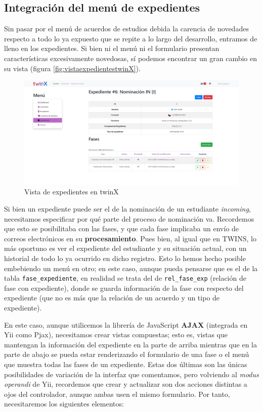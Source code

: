 \subsection{Integración del menú de expedientes}

Sin pasar por el menú de acuerdos de estudios debida la carencia de novedades respecto a todo lo ya expuesto que se repite a lo largo del desarrollo, entramos de lleno en los expedientes. Si bien ni el menú ni el formulario presentan características excesivamente novedosas, sí podemos encontrar un gran cambio en su vista (figura \ref{fig:vistaexpedientestwinX}).

\begin{figure}
	\centering
	\includegraphics[width=\linewidth]{Capturas de twinX/vista_expediente}
	\caption{Vista de expedientes en twinX}
	\label{fig:vistaexpedientetwinX}
\end{figure}

Si bien un expediente puede ser el de la nominación de un estudiante \textit{incoming}, necesitamos especificar por qué parte del proceso de nominación va. Recordemos que esto se posibilitaba con las fases, y que cada fase implicaba un envío de correos electrónicos en su \textbf{procesamiento}. Pues bien, al igual que en TWINS, lo más oportuno es ver el expediente del estudiante y su situación actual, con un historial de todo lo ya ocurrido en dicho registro. Esto lo hemos hecho posible embebiendo un menú en otro; en este caso, aunque pueda pensarse que es el de la tabla \texttt{fase\_expediente}, en realidad se trata del de \texttt{rel\_fase\_exp} (relación de fase con expediente), donde se guarda información de la fase con respecto del expediente (que no es más que la relación de un acuerdo y un tipo de expediente).

En este caso, aunque utilicemos la librería de JavaScript \textbf{AJAX} (integrada en Yii como Pjax), necesitamos crear vistas compuestas; esto es, vistas que mantengan la información del expediente en la parte de arriba mientras que en la parte de abajo se pueda estar renderizando el formulario de una fase o el menú que muestra todas las fases de un expediente. Estas dos últimas son las únicas posibilidades de variación de la interfaz que comentamos, pero volviendo al \textit{modus operandi} de Yii, recordemos que crear y actualizar son dos acciones distintas a ojos del controlador, aunque ambas usen el mismo formulario. Por tanto, necesitaremos los siguientes elementos:

